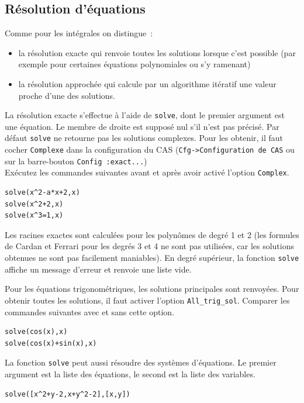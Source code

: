 \documentclass{article}
\begin{document}
\subsection{R\'esolution d'\'equations}
%
Comme pour les int\'egrales on distingue~:
\begin{itemize}
\item
la r\'esolution exacte qui renvoie toutes les solutions 
lorsque c'est possible (par exemple pour certaines \'equations polynomiales
ou s'y ramenant)
\item
la r\'esolution approch\'ee qui calcule par un algorithme it\'eratif
une valeur proche d'une des solutions.
\end{itemize}
La r\'esolution exacte s'effectue \`a l'aide de \verb|solve|, dont le
premier argument est une \'equation. Le membre de droite est
suppos\'e nul s'il n'est pas pr\'ecis\'e. Par 
d\'efaut \verb|solve| ne retourne pas les solutions complexes. 
Pour les obtenir, il faut cocher \verb|Complexe| dans la configuration du CAS
({\tt Cfg->Configuration de CAS} ou sur la barre-bouton 
{\tt Config :exact...})\\ 
Ex\'ecutez les commandes suivantes
avant et apr\`es avoir activ\'e l'option \verb|Complex|. 
\begin{verbatim}
solve(x^2-a*x+2,x)
solve(x^2+2,x)
solve(x^3=1,x)
\end{verbatim}
Les racines exactes sont calcul\'ees pour les polyn\^omes de
degr\'e 1 et 2 (les formules de Cardan et Ferrari pour les degr\'es
3 et 4 ne sont pas utilis\'ees, car les solutions obtenues
ne sont pas facilement maniables). En degr\'e sup\'erieur,
la fonction \verb|solve| affiche un message d'erreur et renvoie
une liste vide.

Pour les \'equations trigonom\'etriques, les solutions principales
sont renvoy\'ees. Pour obtenir toutes les solutions, il faut activer
l'option \verb|All_trig_sol|. Comparer les commandes suivantes avec et
sans cette option.
\begin{verbatim}
solve(cos(x),x)
solve(cos(x)+sin(x),x)
\end{verbatim}

La fonction \verb|solve| peut aussi r\'esoudre des syst\`emes
d'\'equations. Le premier argument est la liste des \'equations, le
second est la liste des variables.
\begin{verbatim}
solve([x^2+y-2,x+y^2-2],[x,y])
\end{verbatim}
\end{document}

